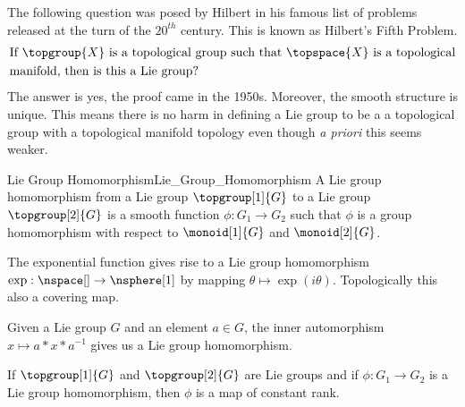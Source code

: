 \documentclass[oneside]{book}                                                  %
\begin{document}
            The following question was posed by Hilbert in his famous list of
            problems released at the turn of the $20^{th}$ century. This is
            known as Hilbert's Fifth Problem.
            \begin{equation}
                \begin{split}
                    &\text{If }\topgroup{X}
                    \text{ is a topological group such that }
                    \topspace{X}\text{ is a topological}\\
                    &\text{manifold, then is this a Lie group?}
                \end{split}
            \end{equation}
            The answer is yes, the proof came in the 1950s. Moreover, the
            smooth structure is unique. This means there is no harm in defining
            a Lie group to be a a topological group with a topological manifold
            topology even though \textit{a priori} this seems weaker.
            \begin{fdefinition}{Lie Group Homomorphism}{Lie_Group_Homomorphism}
                A Lie group homomorphism from a Lie group
                $\topgroup[1]{G}$ to a Lie group $\topgroup[2]{G}$ is a smooth
                function $\phi:G_{1}\rightarrow{G}_{2}$ such that $\phi$ is a
                group homomorphism with respect to $\monoid[1]{G}$ and
                $\monoid[2]{G}$.
            \end{fdefinition}
            \begin{example}
                The exponential function gives rise to a Lie group homomorphism
                $\exp:\nspace[]\rightarrow\nsphere[1]$ by mapping
                $\theta\mapsto\exp(i\theta)$. Topologically this also a covering
                map.
            \end{example}
            \begin{example}
                Given a Lie group $G$ and an element $a\in{G}$, the inner
                automorphism $x\mapsto{a}*x*a^{\minus{1}}$ gives us a Lie group
                homomorphism.
            \end{example}
            \begin{theorem}
                If $\topgroup[1]{G}$ and $\topgroup[2]{G}$ are Lie groups and if
                $\phi:G_{1}\rightarrow{G}_{2}$ is a Lie group homomorphism, then
                $\phi$ is a map of constant rank.
            \end{theorem}
\end{document}
